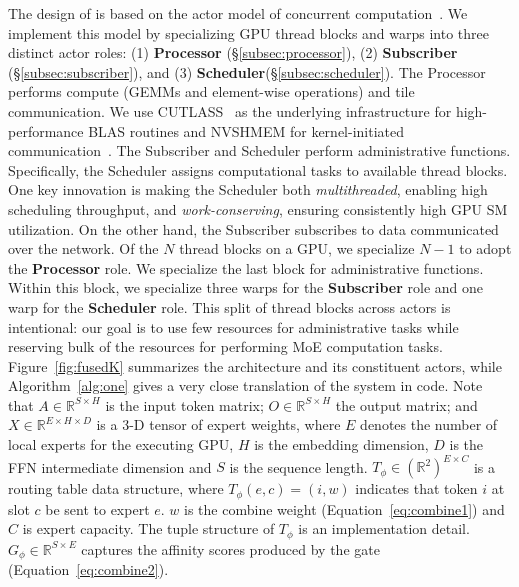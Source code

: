 The design of \sysname is based on the actor model of concurrent computation~\cite{agha:85, 10.5555/1624775.1624804, Greif:75}. We implement this model by specializing GPU thread blocks and warps into three distinct actor roles: (1) \textbf{Processor} (\S\ref{subsec:processor}), (2) \textbf{Subscriber} (\S\ref{subsec:subscriber}), and (3) \textbf{Scheduler}(\S\ref{subsec:scheduler}).
The Processor performs compute (GEMMs and element-wise operations) and tile communication. We use CUTLASS~\cite{Thakkar_CUTLASS_2023} as the underlying infrastructure for high-performance BLAS routines and NVSHMEM for kernel-initiated communication~\cite{nvshm}. The Subscriber and Scheduler perform administrative functions. Specifically, the Scheduler assigns computational tasks to available thread blocks. One key innovation is making the Scheduler both \emph{multithreaded}, enabling high scheduling throughput, and \emph{work-conserving}, ensuring consistently high GPU SM utilization. On the other hand, the Subscriber subscribes to data communicated over the network. Of the $N$ thread blocks on a GPU, we specialize $N-1$ to adopt the \textbf{Processor} role. We specialize the last block for administrative functions. Within this block, we specialize three warps for the \textbf{Subscriber} role and one warp for the \textbf{Scheduler} role. This split of thread blocks across actors is intentional: our goal is to use few resources for administrative tasks while reserving bulk of the resources for performing MoE computation tasks. Figure~\ref{fig:fusedK} summarizes the \sysname architecture and its constituent actors, while Algorithm~\ref{alg:one} gives a very close translation of the
system in code. Note that $A \in \mathbb{R}^{S \times H}$ is the input token matrix;
$O \in \mathbb{R}^{S \times H}$ the output matrix;
and $X \in \mathbb{R}^{E\times H \times D}$ is a 3-D tensor of expert weights,
where $E$ denotes the number of local experts for the executing GPU, $H$ is the embedding dimension,
$D$ is the FFN intermediate dimension and $S$ is the sequence length. $T_{\phi} \in \left(\mathbb{R}^2\right)^{E \times C}$
is a routing table data structure, where $T_{\phi}\left( e, c\right) = (i, w)$ indicates that token $i$ at slot $c$
be sent to expert $e$. $w$ is the combine weight (Equation~\ref{eq:combine1}) and $C$ is expert capacity.
The tuple structure of $T_{\phi}$ is an implementation detail. $G_{\phi} \in \mathbb{R}^{S \times E}$ captures
the affinity scores produced by the gate (Equation~\ref{eq:combine2}).

